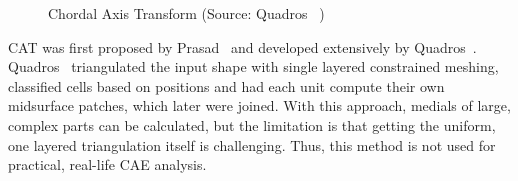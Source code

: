 	\begin{figure}[!h]
	\centering     %
	 \quad
	\caption{Chordal  Axis Transform (Source: Quadros~\cite{QuadrosRoshanOwenBrewerShimada2004} )} %
	\label{fig:litsurvey:cat}
	\end{figure}
	

CAT was first proposed by Prasad~\cite{Prasad2007} and developed extensively by Quadros~\cite{QuadrosShimadaOwen2004, QuadrosRoshanOwenBrewerShimada2004, Quadros2008}.
Quadros~\cite{QuadrosShimadaOwen2004, Quadros2008, Quadros2000} triangulated the input shape with single layered constrained meshing, classified cells based on positions and had each unit compute their own midsurface patches, which later were joined. With this approach, medials of large, complex parts can be calculated, but the limitation is that getting the uniform, one layered triangulation itself is challenging. Thus, this method is not used for practical, real-life CAE analysis.
	
